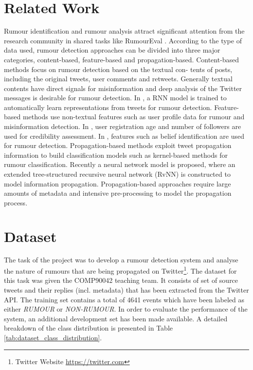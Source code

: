 \documentclass[11pt,a4paper]{article}
\begin{document}
\section{Related Work}
Rumour identification and rumour analysis attract significant attention from the research community in shared tasks like RumourEval \citep{RN664}.
According to the type of data used, rumour detection approaches can be divided into three major categories, content-based, feature-based and propagation-based.
\newline
Content-based methods focus on rumour detection based on the textual con- tents of posts, including the original tweets, user comments and retweets. Generally textual contents have direct signals for misinformation and deep analysis of the Twitter messages is desirable for rumour detection. In \cite{RN676}, a RNN model is trained to automatically learn representations from tweets for rumour detection. 
\newline
Feature-based methods use non-textual features such as user profile data for rumour and misinformation detection. In \cite{RN678}, user registration age and number of followers are used for credibility assessment. In \cite{RN677}, features such as belief identification are used for rumour detection.
\newline
Propagation-based methods exploit tweet propagation information to build classification models such as kernel-based methods for rumour classification.
Recently a neural network model \cite{RN679} is proposed, where an extended tree-structured recursive neural network (RvNN) is constructed to model information propagation. Propagation-based approaches require large amounts of metadata and intensive pre-processing to model the propagation process.


\section{Dataset}
The task of the project was to develop a rumour detection system and analyse the nature of rumours that are being propagated on Twitter\footnote{Twitter Website \url{https://twitter.com}}.
The dataset for this task was given the COMP90042 teaching team. It consists of set of source tweets and their replies (incl. metadata) that has been extracted from the Twitter API.
The training set contains a total of 4641 events which have been labeled as either \textit{RUMOUR} or \textit{NON-RUMOUR}. In order to evaluate the performance of the system, an additional development set has been made available. A detailed breakdown of the class distribution is presented in Table \ref{tab:dataset_class_distribution}.
\end{document}
